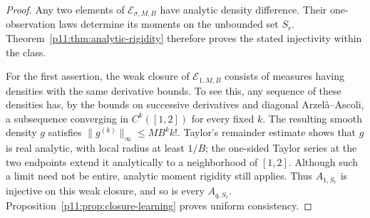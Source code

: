 \documentclass[11pt,letterpaper]{article}
\theoremstyle{definition}
\theoremstyle{remark}
\newcommand{\1}{\mathbf 1}
\begin{document}
\begin{proof}
Any two elements of $\mathcal E_{\sigma,M,B}$ have analytic density
difference.  Their one-observation laws determine its moments on the
unbounded set $S_r$.  Theorem~\ref{p11:thm:analytic-rigidity} therefore
proves the stated injectivity within the class.

For the first assertion, the weak closure of $\mathcal E_{1,M,B}$
consists of measures having densities with the same derivative bounds.
To see this, any sequence of these densities has, by the bounds on
successive derivatives and diagonal Arzel\`a--Ascoli, a subsequence
converging in $C^k([1,2])$ for every fixed $k$.  The resulting smooth
density $g$ satisfies $\|g^{(k)}\|_\infty\leq MB^k k!$.
Taylor's remainder estimate shows that $g$ is real analytic, with
local radius at least $1/B$; the one-sided Taylor series at the two
endpoints extend it analytically to a neighborhood of $[1,2]$.
Although such a limit need not be entire, analytic moment rigidity
still applies.  Thus $A_{1,S_r}$ is injective on this weak closure,
and so is every $A_{q,S_r}$.  Proposition~\ref{p11:prop:closure-learning}
proves uniform consistency.


\end{proof}
\end{document}
